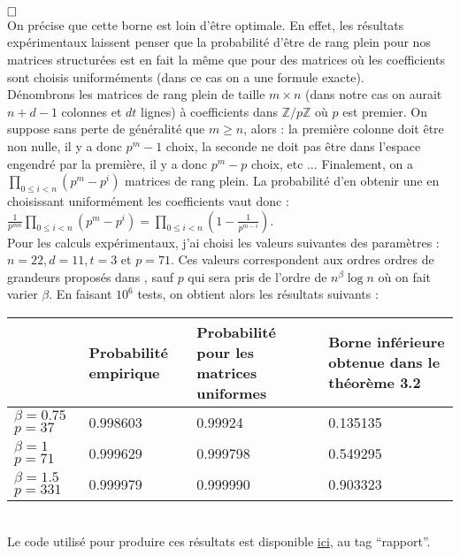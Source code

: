 \documentclass[11pt,a4paper]{article}
\begin{document}
$\hfill \square$ 
\\

On précise que cette borne est loin d'être optimale. En effet, les résultats expérimentaux laissent penser que la probabilité d'être de rang plein pour nos matrices structurées est en fait la même que pour des matrices où les coefficients sont choisis uniforméments (dans ce cas on a une formule exacte). \\

Dénombrons les matrices de rang plein de taille $m \times n$ (dans notre cas on aurait $n+d-1$ colonnes et $dt$ lignes) à coefficients dans $\mathbb{Z}/p\mathbb{Z}$ où $p$ est premier. On suppose sans perte de généralité que $m\geq n$, alors : la première colonne doit être non nulle, il y a donc $p^m-1$ choix, la seconde ne doit pas être dans l'espace engendré par la première, il y a donc $p^m -p$ choix, etc $\dots$ Finalement, on a $\displaystyle \prod_{0\leq i < n}(p^m - p^i)$ matrices de rang plein. La probabilité d'en obtenir une en choisissant uniformément les coefficients vaut donc :  $ \displaystyle \frac{1}{p^{mn}} \prod_{0\leq i < n}(p^m - p^i) = \displaystyle \prod_{0\leq i < n}(1 - \frac{1}{p^{m-i}})$. \\

Pour les calculs expérimentaux, j'ai choisi les valeurs suivantes des paramètres : $n=22, d=11, t=3$ et $p=71$. Ces valeurs correspondent aux ordres ordres de grandeurs proposés dans \cite{mplwe}, sauf $p$ qui sera pris de l'ordre de $n^\beta\log{n}$ où on fait varier $\beta$.  En faisant $10^6$ tests, on obtient alors les résultats suivants : \\

{
\centering
\begin{tabular}{|C{2cm}|C{3cm}|C{3cm}|C{3cm}|}
	\hline 
	& Probabilité empirique & Probabilité pour les matrices uniformes & Borne inférieure obtenue dans le théorème 3.2 \\	  
	\hline
	$\beta=0.75$ $p=37$  & 0.998603 & 0.99924 & 0.135135  \\ 
	\hline
	$\beta=1$ $p=71$  & 0.999629 & 0.999798 & 0.549295  \\
	\hline
	$\beta=1.5$ $p=331$  & 0.999979 & 0.999990 & 0.903323 \\
	\hline
\end{tabular}\par
}
~\\


Le code utilisé pour produire ces résultats est disponible \href{https://github.com/Hazdard/mplwe-sage/tree/main}{ici}, au tag ``rapport''.
\end{document}
